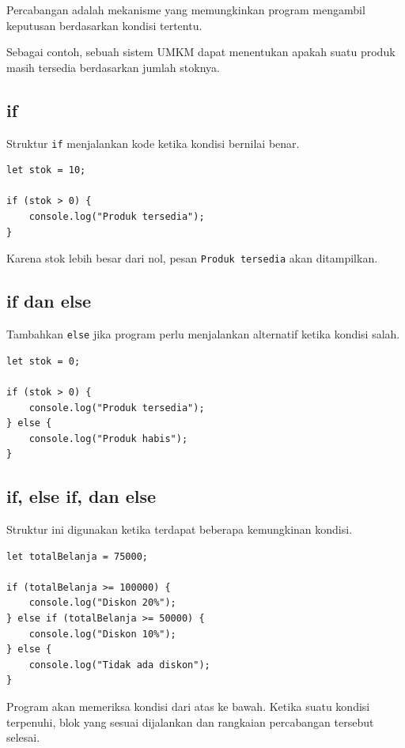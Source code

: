 \documentclass[12pt,a4paper]{article}
\begin{document}
Percabangan adalah mekanisme yang memungkinkan
program mengambil keputusan berdasarkan kondisi
tertentu.

Sebagai contoh, sebuah sistem UMKM dapat menentukan
apakah suatu produk masih tersedia berdasarkan
jumlah stoknya.

\subsection{if}

Struktur \texttt{if} menjalankan kode ketika
kondisi bernilai benar.

\begin{lstlisting}
let stok = 10;

if (stok > 0) {
    console.log("Produk tersedia");
}
\end{lstlisting}

Karena stok lebih besar dari nol, pesan
\texttt{Produk tersedia} akan ditampilkan.

\subsection{if dan else}

Tambahkan \texttt{else} jika program perlu
menjalankan alternatif ketika kondisi salah.

\begin{lstlisting}
let stok = 0;

if (stok > 0) {
    console.log("Produk tersedia");
} else {
    console.log("Produk habis");
}
\end{lstlisting}

\subsection{if, else if, dan else}

Struktur ini digunakan ketika terdapat beberapa
kemungkinan kondisi.

\begin{lstlisting}
let totalBelanja = 75000;

if (totalBelanja >= 100000) {
    console.log("Diskon 20%");
} else if (totalBelanja >= 50000) {
    console.log("Diskon 10%");
} else {
    console.log("Tidak ada diskon");
}
\end{lstlisting}

Program akan memeriksa kondisi dari atas ke bawah.
Ketika suatu kondisi terpenuhi, blok yang sesuai
dijalankan dan rangkaian percabangan tersebut
selesai.
\end{document}
